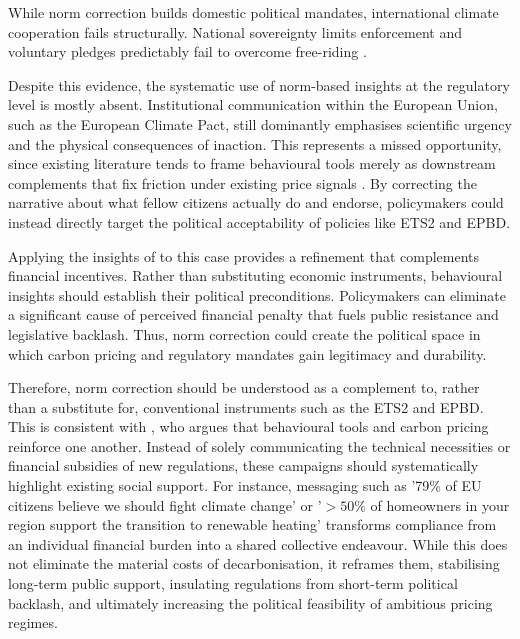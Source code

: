 \documentclass[11pt,a4paper]{scrartcl}
\numberwithin{equation}{section}
\theoremstyle{definition}
\theoremstyle{remark}
\begin{document}
    While norm correction builds domestic political mandates, international climate cooperation fails structurally. National sovereignty limits enforcement and voluntary pledges predictably fail to overcome free-riding \parencite{ockenfels2023_ECONtributePB52, cramton2017}.

    Despite this evidence, the systematic use of norm-based insights at the regulatory level is mostly absent. Institutional communication within the European Union, such as the European Climate Pact, still dominantly emphasises scientific urgency and the physical consequences of inaction. This represents a missed opportunity, since existing literature tends to frame behavioural tools merely as downstream complements that fix friction under existing price signals \parencite{gravert2022}. By correcting the narrative about what fellow citizens actually do and endorse, policymakers could instead directly target the political acceptability of policies like ETS2 and EPBD.

    Applying the insights of \textcite{andre2024} to this case provides a refinement that complements financial incentives. Rather than substituting economic instruments, behavioural insights should establish their political preconditions. Policymakers can eliminate a significant cause of perceived financial penalty that fuels public resistance and legislative backlash. Thus, norm correction could create the political space in which carbon pricing and regulatory mandates gain legitimacy and durability.

    Therefore, norm correction should be understood as a complement to, rather than a substitute for, conventional instruments such as the ETS2 and EPBD. This is consistent with \textcite{gravert2022}, who argues that behavioural tools and carbon pricing reinforce one another. Instead of solely communicating the technical necessities or financial subsidies of new regulations, these campaigns should systematically highlight existing social support. For instance, messaging such as '79\% of EU citizens believe we should fight climate change' or '$> 50\%$ of homeowners in your region support the transition to renewable heating' transforms compliance from an individual financial burden into a shared collective endeavour. While this does not eliminate the material costs of decarbonisation, it reframes them, stabilising long-term public support, insulating regulations from short-term political backlash, and ultimately increasing the political feasibility of ambitious pricing regimes.
\end{document}
